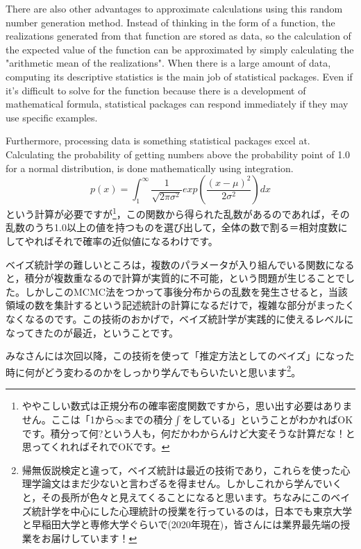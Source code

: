 \documentclass{ltjsarticle}
\begin{document}
There are also other advantages to approximate calculations using this random number generation method. Instead of thinking in the form of a function, the realizations generated from that function are stored as data, so the calculation of the expected value of the function can be approximated by simply calculating the "arithmetic mean of the realizations". When there is a large amount of data, computing its descriptive statistics is the main job of statistical packages. Even if it's difficult to solve for the function because there is a development of mathematical formula, statistical packages can respond immediately if they may use specific examples.

Furthermore, processing data is something statistical packages excel at. Calculating the probability of getting numbers above the probability point of 1.0 for a normal distribution, is done mathematically using integration.
\[ p(x) = \int_1^{\infty} \frac{1}{\sqrt{2\pi \sigma^2}}exp\left( \frac{(x-\mu)^2}{2\sigma^2}\right) dx \]
という計算が必要ですが\footnote{ややこしい数式は正規分布の確率密度関数ですから，思い出す必要はありません。ここは「1から$\infty$までの積分$\int$をしている」ということがわかればOKです。積分って何?という人も，何だかわからんけど大変そうな計算だな！と思ってくれればそれでOKです。}，この関数から得られた乱数があるのであれば，その乱数のうち1.0以上の値を持つものを選び出して，全体の数で割る＝相対度数にしてやればそれで確率の近似値になるわけです。


ベイズ統計学の難しいところは，複数のパラメータが入り組んでいる関数になると，積分が複数重なるので計算が実質的に不可能，という問題が生じることでした。しかしこのMCMC法をつかって事後分布からの乱数を発生させると，当該領域の数を集計するという記述統計の計算になるだけで，複雑な部分がまったくなくなるのです。この技術のおかげで，ベイズ統計学が実践的に使えるレベルになってきたのが最近，ということです。

みなさんには次回以降，この技術を使って「推定方法としてのベイズ」になった時に何がどう変わるのかをしっかり学んでもらいたいと思います\footnote{帰無仮説検定と違って，ベイズ統計は最近の技術であり，これらを使った心理学論文はまだ少ないと言わざるを得ません。しかしこれから学んでいくと，その長所が色々と見えてくることになると思います。ちなみにこのベイズ統計学を中心にした心理統計の授業を行っているのは，日本でも東京大学と早稲田大学と専修大学ぐらいで(2020年現在)，皆さんには業界最先端の授業をお届けしています！}。
\end{document}
